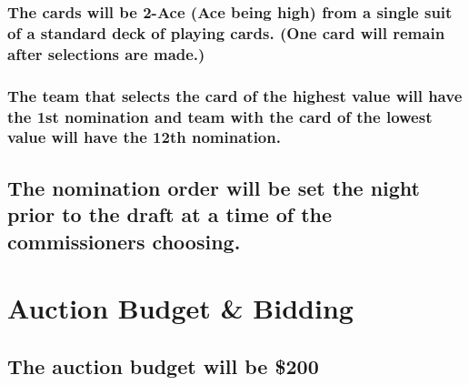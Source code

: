\documentclass[
]{book}
\begin{document}
\hypertarget{the-cards-will-be-2-ace-ace-being-high-from-a-single-suit-of-a-standard-deck-of-playing-cards.-one-card-will-remain-after-selections-are-made.}{%
\subsubsection{The cards will be 2-Ace (Ace being high) from a single suit of a standard deck of playing cards. (One card will remain after selections are made.)}\label{the-cards-will-be-2-ace-ace-being-high-from-a-single-suit-of-a-standard-deck-of-playing-cards.-one-card-will-remain-after-selections-are-made.}}

\hypertarget{the-team-that-selects-the-card-of-the-highest-value-will-have-the-1st-nomination-and-team-with-the-card-of-the-lowest-value-will-have-the-12th-nomination.}{%
\subsubsection{The team that selects the card of the highest value will have the 1st nomination and team with the card of the lowest value will have the 12th nomination.}\label{the-team-that-selects-the-card-of-the-highest-value-will-have-the-1st-nomination-and-team-with-the-card-of-the-lowest-value-will-have-the-12th-nomination.}}

\hypertarget{the-nomination-order-will-be-set-the-night-prior-to-the-draft-at-a-time-of-the-commissioners-choosing.}{%
\subsection{The nomination order will be set the night prior to the draft at a time of the commissioners choosing.}\label{the-nomination-order-will-be-set-the-night-prior-to-the-draft-at-a-time-of-the-commissioners-choosing.}}

\hypertarget{auction-budget-bidding}{%
\section{Auction Budget \& Bidding}\label{auction-budget-bidding}}

\hypertarget{the-auction-budget-will-be-200}{%
\subsection{The auction budget will be \$200}\label{the-auction-budget-will-be-200}}
\end{document}
